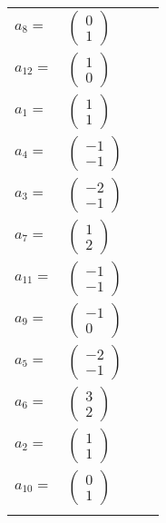 \documentclass[1p]{elsarticle_modified}
\theoremstyle{definition}
\begin{document}
\begin{tabular}{m{7pt} m{180pt} m{7pt} m{180pt} }
\flushright $a_{8}=$&$\begin{pmatrix}0\\1\end{pmatrix}$ \\
\flushright $a_{12}=$&$\begin{pmatrix}1\\0\end{pmatrix}$ \\
\flushright $a_{1}=$&$\begin{pmatrix}1\\1\end{pmatrix}$ \\
\flushright $a_{4}=$&$\begin{pmatrix}-1\\-1\end{pmatrix}$ \\
\flushright $a_{3}=$&$\begin{pmatrix}-2\\-1\end{pmatrix}$ \\
\flushright $a_{7}=$&$\begin{pmatrix}1\\2\end{pmatrix}$ \\
\flushright $a_{11}=$&$\begin{pmatrix}-1\\-1\end{pmatrix}$ \\
\flushright $a_{9}=$&$\begin{pmatrix}-1\\0\end{pmatrix}$ \\
\flushright $a_{5}=$&$\begin{pmatrix}-2\\-1\end{pmatrix}$ \\
\flushright $a_{6}=$&$\begin{pmatrix}3\\2\end{pmatrix}$ \\
\flushright $a_{2}=$&$\begin{pmatrix}1\\1\end{pmatrix}$ \\
\flushright $a_{10}=$&$\begin{pmatrix}0\\1\end{pmatrix}$\\&\end{tabular}
\end{document}
